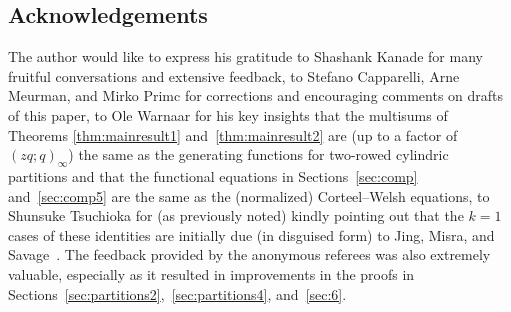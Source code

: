 \documentclass[10pt,a4paper]{amsart}
\numberwithin{equation}{section}
\theoremstyle{definition}
\begin{document}
\subsection*{Acknowledgements}

The author would like to express his gratitude to Shashank Kanade for many fruitful conversations and extensive feedback, to Stefano Capparelli, Arne Meurman, and Mirko Primc for corrections and encouraging comments on drafts of this paper, to Ole Warnaar for his key insights that the multisums of Theorems \ref{thm:mainresult1} and~\ref{thm:mainresult2} are (up to a factor of $(zq;q)_\infty$) the same as the generating functions for two-rowed cylindric partitions and that the functional equations in Sections~\ref{sec:comp} and~\ref{sec:comp5} are the same as the (normalized) Corteel--Welsh equations, to Shunsuke Tsuchioka for (as previously noted) kindly pointing out that the $k=1$ cases of these identities are initially due (in disguised form) to Jing, Misra, and Savage~\cite{JMS}. The feedback provided by the anonymous referees was also extremely valuable, especially as it resulted in improvements in the proofs in Sections~\ref{sec:partitions2},~\ref{sec:partitions4}, and~\ref{sec:6}.

%
%

\end{document}
